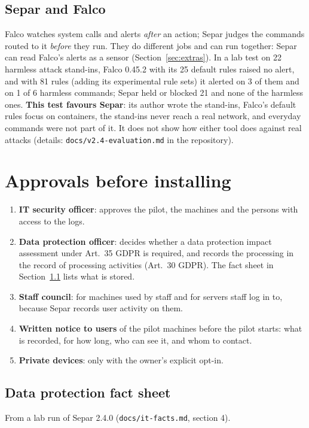 \documentclass[11pt,a4paper]{article}
\begin{document}
\subsection{Separ and Falco}
Falco watches system calls and alerts \emph{after} an action; Separ judges the commands routed to
it \emph{before} they run. They do different jobs and can run together: Separ can read Falco's
alerts as a sensor (Section~\ref{sec:extras}). In a lab test on 22 harmless attack stand-ins,
Falco 0.45.2 with its 25 default rules raised no alert, and with 81 rules (adding its experimental
rule sets) it alerted on 3 of them and on 1 of 6 harmless commands; Separ held or blocked 21 and
none of the harmless ones. \textbf{This test favours Separ}: its author wrote the stand-ins, Falco's
default rules focus on containers, the stand-ins never reach a real network, and everyday commands
were not part of it. It does not show how either tool does against real attacks (details:
\texttt{docs/v2.4-evaluation.md} in the repository).

\section{Approvals before installing}
\label{sec:approvals}

\begin{enumerate}
  \item \textbf{IT security officer}: approves the pilot, the machines and the persons with access
    to the logs.
  \item \textbf{Data protection officer}: decides whether a data protection impact assessment under
    Art.~35 GDPR is required, and records the processing in the record of processing activities
    (Art.~30 GDPR). The fact sheet in Section~\ref{sec:facts} lists what is stored.
  \item \textbf{Staff council}: for machines used by staff and for servers staff log in to, because
    Separ records user activity on them.
  \item \textbf{Written notice to users} of the pilot machines before the pilot starts: what is
    recorded, for how long, who can see it, and whom to contact.
  \item \textbf{Private devices}: only with the owner's explicit opt-in.
\end{enumerate}

\subsection{Data protection fact sheet}
\label{sec:facts}
From a lab run of Separ 2.4.0 (\texttt{docs/it-facts.md}, section 4).
\end{document}
